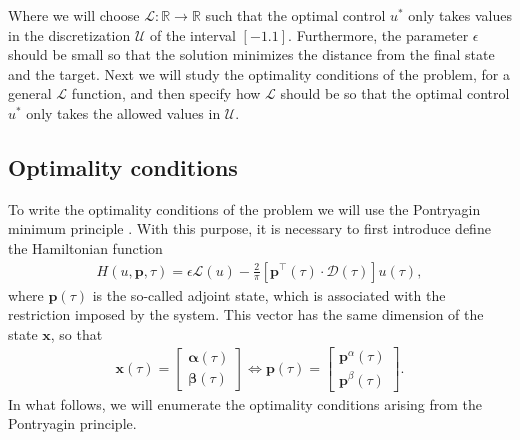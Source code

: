Where we will choose $ \mathcal {L}: \mathbb {R} \rightarrow \mathbb {R} $ such that the optimal control $ u^* $ only takes values in the discretization $ \mathcal {U} $ of the interval $ [- 1.1] $. Furthermore, the parameter $ \epsilon $ should be small so that the solution minimizes the distance from the final state and the target.
%
Next we will study the optimality conditions of the problem, for a general $ \mathcal {L} $ function, and then specify how $ \mathcal {L} $ should be so that the optimal control $ u ^ * $ only takes the allowed values in $ \mathcal {U} $.

\subsection{Optimality conditions}

To write the optimality conditions of the problem we will use the Pontryagin minimum principle \cite[Chapter~2.7]{bryson1975applied}. With this purpose, it is necessary to first introduce define the Hamiltonian function 
\begin{align*}\label{eq:hamil}
    H(u,\bm{p},\tau) = \epsilon \mathcal{L}(u) - \frac 2\pi\left[\bm{p}^\top(\tau) \cdot \bm{\mathcal{D}}(\tau)\right]u(\tau),
\end{align*}
where $\bm{p}(\tau)$ is the so-called adjoint state, which is associated with the restriction imposed by the system. This vector has the same dimension of the state $\bm{x}$, so that
\begin{gather}
  \bm{x}(\tau) = \begin{bmatrix} \bm{\alpha}(\tau) \\ \bm{\beta}(\tau) \end{bmatrix} \Leftrightarrow 
  \bm{p}(\tau) = \begin{bmatrix} \bm{p}^\alpha(\tau) \\ \bm{p}^\beta(\tau) \end{bmatrix}.
\end{gather}
In what follows, we will enumerate the optimality conditions arising from the Pontryagin principle.
